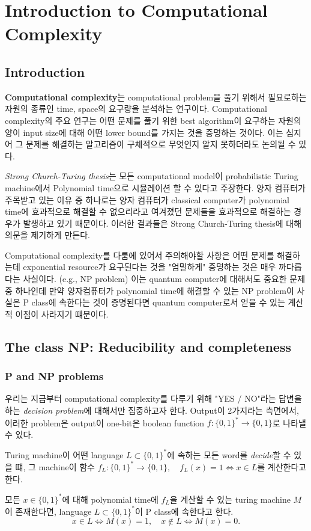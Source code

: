 \chapter{Introduction to Computational Complexity}

\section{Introduction}
\textbf{Computational complexity}는 computational problem을 풀기 위해서 필요로하는 자원의 종류인 time, space의 요구량을 분석하는 연구이다.
Computational complexity의 주요 연구는 어떤 문제를 풀기 위한 best algorithm이 요구하는 자원의 양이 input size에 대해 어떤 lower bound를 가지는 것을 증명하는 것이다. 이는 심지어 그 문제를 해결하는 알고리즘이 구체적으로 무엇인지 알지 못하더라도 논의될 수 있다.

\textit{Strong Church-Turing thesis}는 모든 computational model이 probabilistic Turing machine에서 Polynomial time으로 시뮬레이션 할 수 있다고 주장한다. 양자 컴퓨터가 주목받고 있는 이유 중 하나로는 양자 컴퓨터가 classical computer가 polynomial time에 효과적으로 해결할 수 없으리라고 여겨졌던 문제들을 효과적으로 해결하는 경우가 발생하고 있기 때문이다. 이러한 결과들은 Strong Church-Turing thesis에 대해 의문을 제기하게 만든다.

Computational complexity를 다룸에 있어서 주의해야할 사항은 어떤 문제를 해결하는데 exponential resource가 요구된다는 것을 "엄밀하게" 증명하는 것은 매우 까다롭다는 사실이다. (e.g., NP problem)
이는 quantum computer에 대해서도 중요한 문제 중 하나인데 만약 양자컴퓨터가 polynomial time에 해결할 수 있는 NP problem이 사실은 P class에 속한다는 것이 증명된다면 quantum computer로서 얻을 수 있는 계산적 이점이 사라지기 떄문이다.

\section{The class NP: Reducibility and completeness}
\subsection{P and NP problems}
우리는 지금부터 computational complexity를 다루기 위해 "YES / NO"라는 답변을 하는 \textit{decision problem}에 대해서만 집중하고자 한다. Output이 2가지라는 측면에서, 이러한 problem은 output이 one-bit은 boolean function $f: \{0, 1\}^* \rightarrow \{0, 1\}$로 나타낼 수 있다.

Turing machine이 어떤 language $L \subset \{0, 1\}^*$에 속하는 모든 word를 \textit{decide}할 수 있을 떄, 그 machine이 함수 $f_L : \{0, 1\}^* \rightarrow \{0, 1\},\quad f_L(x) = 1 \Leftrightarrow x \in L$를 계산한다고 한다.
\begin{definition}\label{def:P-class}
    모든 $x \in \{0, 1\}^*$에 대해 polynomial time에 $f_L$을 계산할 수 있는 turing machine $M$이 존재한다면, language $L \subset \{0, 1\}^*$이 P class에 속한다고 한다.
    \begin{equation*}
        x \in L \Longleftrightarrow M(x)=1, \quad x \notin L \Longleftrightarrow M(x)=0 .
    \end{equation*}
\end{definition}

